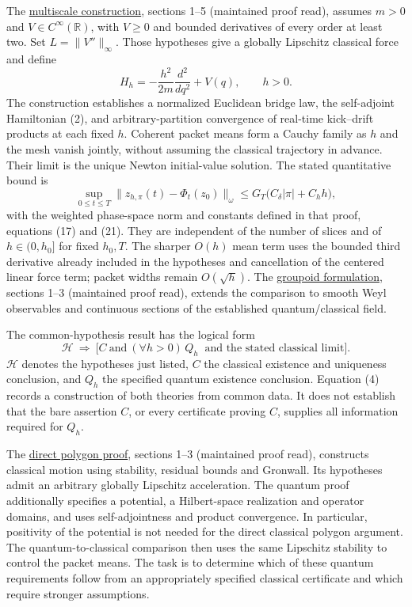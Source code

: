 \documentclass[11pt,a4paper]{article}
\begin{document}
The \href{quantum-blocks-construct-newton.md}{multiscale construction},
sections 1--5 (maintained proof read), assumes \(m>0\) and
\(V\in C^\infty(\mathbb R)\), with \(V\ge0\) and bounded derivatives of
every order at least two. Set \(L=\|V''\|_\infty\). Those hypotheses
give a globally Lipschitz classical force and define \[
 H_h=-\frac{h^2}{2m}\frac{d^2}{dq^2}+V(q),\qquad h>0. \tag{2}
\] The construction establishes a normalized Euclidean bridge law, the
self-adjoint Hamiltonian (2), and arbitrary-partition convergence of
real-time kick--drift products at each fixed \(h\). Coherent packet
means form a Cauchy family as \(h\) and the mesh vanish jointly, without
assuming the classical trajectory in advance. Their limit is the unique
Newton initial-value solution. The stated quantitative bound is \[
 \sup_{0\le t\le T}\|z_{h,\pi}(t)-\Phi_t(z_0)\|_\omega
 \le G_T\big(C_\delta|\pi|+C_hh\big), \tag{3}
\] with the weighted phase-space norm and constants defined in that
proof, equations (17) and (21). They are independent of the number of
slices and of \(h\in(0,h_0]\) for fixed \(h_0,T\). The sharper \(O(h)\)
mean term uses the bounded third derivative already included in the
hypotheses and cancellation of the centered linear force term; packet
widths remain \(O(\sqrt h)\). The
\href{groupoid-quantum-newton-states.md}{groupoid formulation}, sections
1--3 (maintained proof read), extends the comparison to smooth Weyl
observables and continuous sections of the established quantum/classical
field.

The common-hypothesis result has the logical form \[
 \mathcal H\ \Longrightarrow\
 \big[C\ \text{and}\ (\forall h>0)\,Q_h\
                   \text{ and the stated classical limit}\big]. \tag{4}
\] \(\mathcal H\) denotes the hypotheses just listed, \(C\) the
classical existence and uniqueness conclusion, and \(Q_h\) the specified
quantum existence conclusion. Equation (4) records a construction of
both theories from common data. It does not establish that the bare
assertion \(C\), or every certificate proving \(C\), supplies all
information required for \(Q_h\).

The \href{balaban-ode-lesson.md}{direct polygon proof}, sections 1--3
(maintained proof read), constructs classical motion using stability,
residual bounds and Gronwall. Its hypotheses admit an arbitrary globally
Lipschitz acceleration. The quantum proof additionally specifies a
potential, a Hilbert-space realization and operator domains, and uses
self-adjointness and product convergence. In particular, positivity of
the potential is not needed for the direct classical polygon argument.
The quantum-to-classical comparison then uses the same Lipschitz
stability to control the packet means. The task is to determine which of
these quantum requirements follow from an appropriately specified
classical certificate and which require stronger assumptions.
\end{document}
